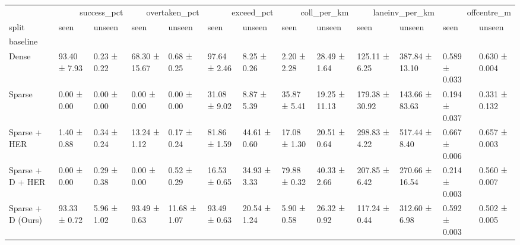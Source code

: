 \begin{tabular}{lllllllllllll}
\toprule
 & \multicolumn{2}{r}{success_pct} & \multicolumn{2}{r}{overtaken_pct} & \multicolumn{2}{r}{exceed_pct} & \multicolumn{2}{r}{coll_per_km} & \multicolumn{2}{r}{laneinv_per_km} & \multicolumn{2}{r}{offcentre_m} \\
split & seen & unseen & seen & unseen & seen & unseen & seen & unseen & seen & unseen & seen & unseen \\
baseline &  &  &  &  &  &  &  &  &  &  &  &  \\
\midrule
Dense & 93.40 ± 7.93 & 0.23 ± 0.22 & 68.30 ± 15.67 & 0.68 ± 0.25 & 97.64 ± 2.46 & 8.25 ± 0.26 & 2.20 ± 2.28 & 28.49 ± 1.64 & 125.11 ± 6.25 & 387.84 ± 13.10 & 0.589 ± 0.033 & 0.630 ± 0.004 \\
Sparse & 0.00 ± 0.00 & 0.00 ± 0.00 & 0.00 ± 0.00 & 0.00 ± 0.00 & 31.08 ± 9.02 & 8.87 ± 5.39 & 35.87 ± 5.41 & 19.25 ± 11.13 & 179.38 ± 30.92 & 143.66 ± 83.63 & 0.194 ± 0.037 & 0.331 ± 0.132 \\
Sparse + HER & 1.40 ± 0.88 & 0.34 ± 0.24 & 13.24 ± 1.12 & 0.17 ± 0.24 & 81.86 ± 1.59 & 44.61 ± 0.60 & 17.08 ± 1.30 & 20.51 ± 0.64 & 298.83 ± 4.22 & 517.44 ± 8.40 & 0.667 ± 0.006 & 0.657 ± 0.003 \\
Sparse + D + HER & 0.00 ± 0.00 & 0.29 ± 0.38 & 0.00 ± 0.00 & 0.52 ± 0.29 & 16.53 ± 0.65 & 34.93 ± 3.33 & 79.88 ± 0.32 & 40.33 ± 2.66 & 207.85 ± 6.42 & 270.66 ± 16.54 & 0.214 ± 0.003 & 0.560 ± 0.007 \\
Sparse + D (Ours) & 93.33 ± 0.72 & 5.96 ± 1.02 & 93.49 ± 0.63 & 11.68 ± 1.07 & 93.49 ± 0.63 & 20.54 ± 1.24 & 5.90 ± 0.58 & 26.32 ± 0.92 & 117.24 ± 0.44 & 312.60 ± 6.98 & 0.592 ± 0.003 & 0.502 ± 0.005 \\
\bottomrule
\end{tabular}
